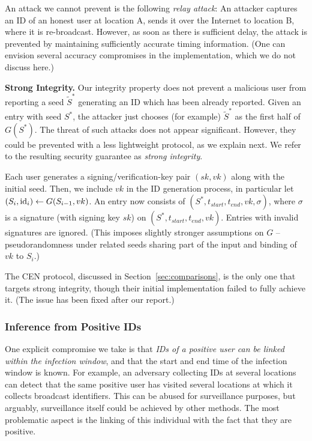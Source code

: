 \documentclass{article}
\begin{document}
An attack we cannot prevent is the following {\em relay attack}: An attacker captures an ID of an honest user at location A, sends it over the Internet to location B, where it is re-broadcast.  However, as soon as there is sufficient delay, the attack is prevented by maintaining sufficiently accurate timing information. (One can envision several accuracy compromises in the implementation, which we do not discuss here.)

{\bf Strong Integrity.} Our integrity property does not prevent a malicious user from reporting a seed $\widetilde{S}^*$ generating an ID which has been already reported. Given an entry with seed $S^*$, the attacker just chooses (for example) $\widetilde{S}^*$ as the first half of $G(S^*)$. The threat of such attacks does not appear significant. However, they could be prevented with a less lightweight protocol, as we explain next. We refer to the resulting security guarantee as {\em strong integrity}. 

Each user generates a signing/verification-key pair $(sk, vk)$ along with the initial seed. Then, we include $vk$ in the ID generation process, in particular let $(S_i, \mathrm{id}_i) \gets G(S_{i-1}, vk)$. An entry now consists of $(S^*, t_{start}, t_{end}, vk, \sigma)$, where $\sigma$ is a signature (with signing key $sk$) on $(S^*, t_{start}, t_{end}, vk)$. Entries with invalid signatures are ignored. (This imposes slightly stronger assumptions on $G$ -- pseudorandomness under related seeds sharing part of the input and binding of $vk$ to $S_i$.)

The CEN protocol, discussed in Section~\ref{sec:comparisons}, is the only one that targets strong integrity, though their initial implementation failed to fully achieve it. (The issue has been fixed after our report.)

\subsubsection{Inference from Positive IDs} 

One explicit compromise we take is that {\em IDs of a positive user can be linked within the infection window}, and that the start and end time of the infection window is known. For example, an adversary collecting IDs at several locations can detect that the same positive user has visited several locations at which it collects broadcast identifiers. This can be abused for surveillance purposes, but arguably, surveillance itself could be achieved by other methods. The most problematic aspect is the linking of this individual with the fact that they are positive. 
\end{document}
